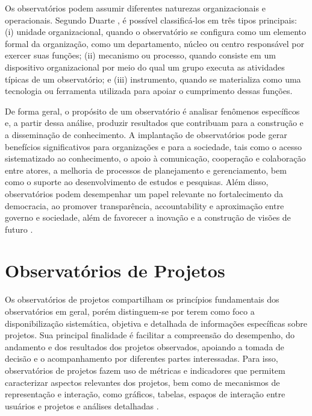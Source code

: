 Os observatórios podem assumir diferentes naturezas organizacionais e operacionais. Segundo Duarte \cite{duarte}, é possível classificá-los em três tipos principais: (i) unidade organizacional, quando o observatório se configura como um elemento formal da organização, como um departamento, núcleo ou centro responsável por exercer suas funções; (ii) mecanismo ou processo, quando consiste em um dispositivo organizacional por meio do qual um grupo executa as atividades típicas de um observatório; e (iii) instrumento, quando se materializa como uma tecnologia ou ferramenta utilizada para apoiar o cumprimento dessas funções.

De forma geral, o propósito de um observatório é analisar fenômenos específicos e, a partir dessa análise, produzir resultados que contribuam para a construção e a disseminação de conhecimento. A implantação de observatórios pode gerar benefícios significativos para organizações e para a sociedade, tais como o acesso sistematizado ao conhecimento, o apoio à comunicação, cooperação e colaboração entre atores, a melhoria de processos de planejamento e gerenciamento, bem como o suporte ao desenvolvimento de estudos e pesquisas. Além disso, observatórios podem desempenhar um papel relevante no fortalecimento da democracia, ao promover transparência, accountability e aproximação entre governo e sociedade, além de favorecer a inovação e a construção de visões de futuro \cite{vieira2020universal}.

\section{Observatórios de Projetos}
Os observatórios de projetos compartilham os princípios fundamentais dos observatórios em geral, porém distinguem-se por terem como foco a disponibilização sistemática, objetiva e detalhada de informações específicas sobre projetos. Sua principal finalidade é facilitar a compreensão do desempenho, do andamento e dos resultados dos projetos observados, apoiando a tomada de decisão e o acompanhamento por diferentes partes interessadas. Para isso, observatórios de projetos fazem uso de métricas e indicadores que permitem caracterizar aspectos relevantes dos projetos, bem como de mecanismos de representação e interação, como gráficos, tabelas, espaços de interação entre usuários e projetos e análises detalhadas \cite{vieira2020universal}.

